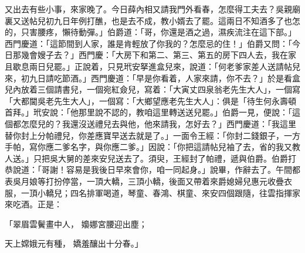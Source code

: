 又出去有些小事，來家晚了。今日薛內相又請我門外看春，怎麼得工夫去？吳親廟裏又送帖兒初九日年例打醮，也是去不成，教小婿去了罷。這兩日不知酒多了也怎的，只害腰疼，懶待動彈。」伯爵道：「哥，你還是酒之過，濕疾流注在這下部。」西門慶道：「這節間到人家，誰是肯輕放了你我的？怎麼忌的住！」伯爵又問：「今日那幾會嫂子去？」西門慶：「大房下和第二、第三、第五的房下四人去，我在家且歇息兩日兒罷。」正說着，只見玳安拏進盒兒來，說道：「何老爹家差人送請帖兒來，初九日請吃節酒。」西門慶道：「早是你看着，人家來請，你不去？」於是看盒兒內放着三個請書兒，一個宛紅僉兒，寫着：「大寅丈四泉翁老先生大人」，一個寫「大都閫吳老先生大人」，一個寫：「大鄉望應老先生大人」：俱是「待生何永壽頓首拜。」玳安說：「他那里說不認的，教咱這里轉送送兒罷。」伯爵一見，便說：「這個都怎麼兒的？我還沒送禮兒去與他，他來請我，怎好去？」西門慶道：「我這里替你封上分帕禮兒，你差應寶早送去就是了。」一面令王經：「你封二錢銀子，一方手帕，寫你應二爹名字，與你應二爹。」因說：「你把這請帖兒袖了去，省的我又教人送。」只把吳大舅的差來安兒送去了。須臾，王經封了帕禮，遞與伯爵。伯爵打恭說道：「哥謝！容易是我後日早來會你，咱一同起身。」說畢，作辭去了。午間都表吳月娘等打扮停當，一頂大轎，三頂小轎，後面又帶着來爵媳婦兒惠元收疊衣服，一頂小轎兒；四名排軍喝道，琴童、春鴻、棋童、來安四個跟隨，往雲指揮家來吃酒。正是：

「翠眉雲鬢畫中人，  嬝娜宮腰迎出塵；

天上嫦娥元有種，  嬌羞釀出十分春。」

